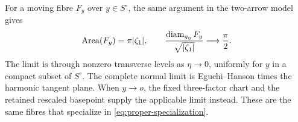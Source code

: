 For a moving fibre $F_y$ over $y\in S^\circ$,
the same argument in the two-arrow model
gives
\begin{equation}\label{eq:moving-diameter}
 \operatorname{Area}(F_y)=\pi|\zeta_1|,
 \qquad
 \frac{\operatorname{diam}_{g_\eta}F_y}{\sqrt{|\zeta_1|}}
       \longrightarrow\frac\pi2.
\end{equation}
The limit is through nonzero transverse
levels as $\eta\to0$, uniformly for $y$
in a compact subset of $S^\circ$.
The complete normal limit is Eguchi--Hanson
times the harmonic tangent plane. When
$y\to o$, the fixed three-factor chart and
the retained rescaled basepoint supply the
applicable limit instead. These are the
same fibres that specialize in
\eqref{eq:proper-specialization}.
